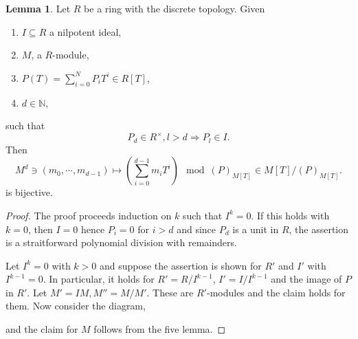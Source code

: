 \documentclass[10pt]{article}
\numberwithin{equation}{section}
\theoremstyle{definition}
\newtheorem{lemma}{Lemma}[subsection]
\newcommand{\N}[0]{\mathbb{N}}
\begin{document}
\begin{lemma}
    \label{lemma_26_1}
    Let $R$ be a ring with the discrete topology. Given 
    \begin{enumerate}
      \item $I\subseteq R$ a nilpotent ideal,
      \item $M$, a $R$-module,
      \item $P(T) = \sum_{i=0}^NP_iT^i\in R[T]$,
      \item $d\in\N$,
    \end{enumerate}
    such that 
    \begin{equation*}
      P_d\in R^\times, l>d\Rightarrow P_l\in I.
    \end{equation*}
    Then 
    \begin{equation*}
        M^d\ni(m_0,\cdots,m_{d-1})\mapsto \left(\sum_{i=0}^{d-1}m_iT^i\right)\mod (P)_{M[T]} \in M[T]/(P)_{M[T]}.
    \end{equation*}
    is bijective.
\end{lemma}

\begin{proof}
    The proof proceeds induction on $k$ such that $I^{k} = 0$. If this holds with $k=0$, then $I=0$ hence $P_i=0$ for $i>d$ and since $P_d$ is a unit in $R$, the assertion is a straitforward polynomial division with remainders.
    \par Let $I^k = 0$ with $k>0$ and suppose the assertion is shown for $R'$ and $I'$ with $I^{k-1} = 0$. In particular, it holds for $R' = R/I^{k-1}$, $I' = I/I^{k-1}$ and the image of $P$ in $R'$. Let $M' = IM, M'' = M/M'$. These are $R'$-modules and the claim holds for them. 
    Now consider the diagram,
    \begin{center}
    \end{center}
    and the claim for $M$ follows from the five lemma.
\end{proof}
\end{document}
